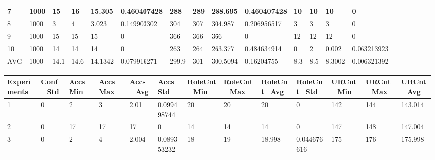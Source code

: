 \begin{table}[H]
\begin{adjustbox}{max width=480pt,keepaspectratio,angle=90}
\begin{tabular}{|l|l|l|l|l|l|l|l|l|l|l|l|l|l|}
					7           & 1000  & 15              & 16              & 15.305          & 0.460407428     & 288                & 289                & 288.695            & 0.460407428        & 10        & 10        & 10        & 0           \\ \hline
					8           & 1000  & 3               & 4               & 3.023           & 0.149903302     & 304                & 307                & 304.987            & 0.206956517        & 3         & 3         & 3         & 0           \\ \hline
					9           & 1000  & 15              & 15              & 15              & 0               & 366                & 366                & 366                & 0                  & 12        & 12        & 12        & 0           \\ \hline
					10          & 1000  & 14              & 14              & 14              & 0               & 263                & 264                & 263.377            & 0.484634914        & 0         & 2         & 0.002     & 0.063213923 \\ \hline
					AVG         & 1000  & 14.1            & 14.6            & 14.1342         & 0.079916271     & 299.9              & 301                & 300.5094           & 0.16204755         & 8.3       & 8.5       & 8.3002    & 0.006321392 \\ \hline
				\end{tabular}
				\end{adjustbox}
				\begin{adjustbox}{max width=480pt,keepaspectratio,angle=90}
					\begin{tabular}{|l|l|l|l|l|l|l|l|l|l|l|l|l|}
						\hline
						\rowcolor[HTML]{EFEFEF} 
						Experiments & Conf\_Std   & Accs\_Min & Accs\_Max & Accs\_Avg & Accs\_Std   & RoleCnt\_Min & RoleCnt\_Max & RoleCnt\_Avg & RoleCnt\_Std & URCnt\_Min & URCnt\_Max & URCnt\_Avg \\ \hline
						1           & 0           & 2         & 3         & 2.01      & 0.099498744 & 20           & 20           & 20           & 0            & 142        & 144        & 143.014    \\ \hline
						2           & 0           & 17        & 17        & 17        & 0           & 14           & 14           & 14           & 0            & 147        & 148        & 147.004    \\ \hline
						3           & 0           & 2         & 4         & 2.004     & 0.089353232 & 18           & 19           & 18.998       & 0.044676616  & 175        & 176        & 175.998    \\ \hline

\end{tabular}
\end{adjustbox}
\end{table}

